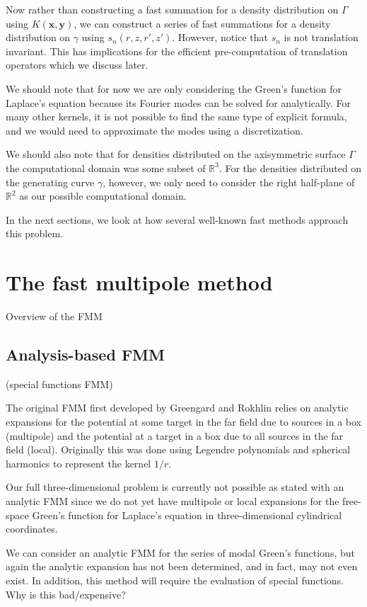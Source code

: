 \documentclass[11pt, oneside]{article}   	%
\begin{document}
Now rather than constructing a fast summation for a density distribution on $\Gamma$ using $K(\mathbf{x},\mathbf{y})$, we can construct a series of fast summations for a density distribution on $\gamma$ using $s_n(r,z,r',z')$. However, notice that $s_n$ is not translation invariant. This has implications for the efficient pre-computation of translation operators which we discuss later.

We should note that for now we are only considering the Green's function for Laplace's equation because its Fourier modes can be solved for analytically. For many other kernels, it is not possible to find the same type of explicit formula, and we would need to approximate the modes using a discretization.

We should also note that for densities distributed on the axisymmetric surface $\Gamma$ the computational domain was some subset of $\mathbb{R}^3$. For the densities distributed on the generating curve $\gamma$, however, we only need to consider the right half-plane of $\mathbb{R}^2$ as our possible computational domain.

In the next sections, we look at how several well-known fast methods approach this problem.

\section{The fast multipole method}
Overview of the FMM

\subsection{Analysis-based FMM} (special functions FMM)

The original FMM \cite{GR} first developed by Greengard and Rokhlin relies on analytic expansions for the potential at some target in the far field due to sources in a box (multipole) and the potential at a target in a box due to all sources in the far field (local). Originally this was done using Legendre polynomials and spherical harmonics to represent the kernel $1/r$.

Our full three-dimensional problem is currently not possible as stated with an analytic FMM since we do not yet have multipole or local expansions for the free-space Green's function for Laplace's equation in three-dimensional cylindrical coordinates.

We can consider an analytic FMM for the series of modal Green's functions, but again the analytic expansion has not been determined, and in fact, may not even exist. In addition, this method will require the evaluation of special functions. Why is this bad/expensive?
\end{document}
